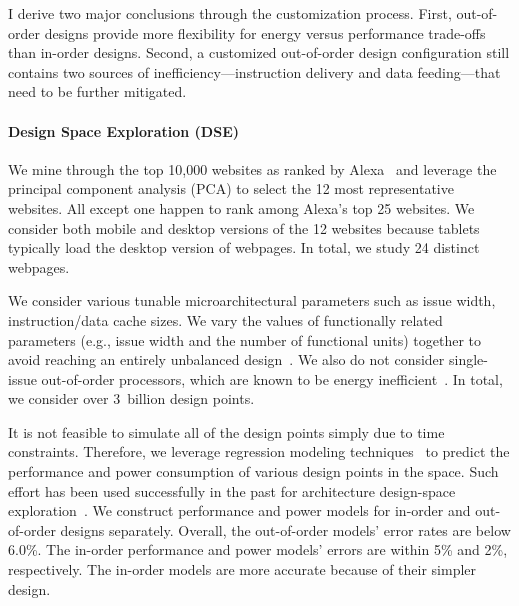 I derive two major conclusions through the customization process. First, out-of-order designs provide more flexibility for energy versus performance trade-offs than in-order designs. Second, a customized out-of-order design configuration still contains two sources of inefficiency---instruction delivery and data feeding---that need to be further mitigated.

\paragraph{Design Space Exploration (DSE)} We mine through the top 10,000 websites as ranked by Alexa~\cite{alexa} and leverage the principal component analysis (PCA) to select the 12 most representative websites. All except one happen to rank among Alexa's top 25 websites. We consider both mobile and desktop versions of the 12 websites because tablets typically load the desktop version of webpages. In total, we study 24 distinct webpages.

We consider various tunable microarchitectural parameters such as issue width, instruction/data cache sizes. We vary the values of functionally related parameters (e.g., issue width and the number of functional units) together to avoid reaching an entirely unbalanced design~\cite{ilp2}. We also do not consider single-issue out-of-order processors, which are known to be energy inefficient~\cite{marginal}. In total, we consider over 3~billion design points.

It is not feasible to simulate all of the design points simply due to time constraints. Therefore, we leverage regression modeling techniques~\cite{RMS} to predict the performance and power consumption of various design points in the space. Such effort has been used successfully in the past for architecture design-space exploration~\cite{dse, comt}. We construct performance and power models for in-order and out-of-order designs separately. Overall, the out-of-order models' error rates are below 6.0\%. The in-order performance and power models' errors are within 5\% and 2\%, respectively. The in-order models are more accurate because of their simpler design.

